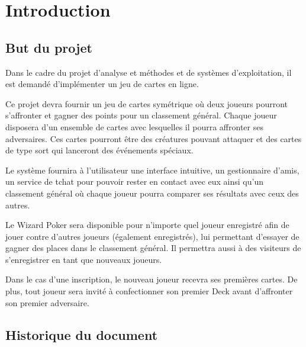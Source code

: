 \documentclass[11pt,a4paper]{article}
\begin{document}

\pagestyle{empty}
\tableofcontents
\newpage
\pagestyle{fancy}

\setcounter{page}{1}

\section{Introduction}
\label{sec:intro}

\subsection{But du projet}
\label{sec:but}

Dans le cadre du projet d'analyse et méthodes et de systèmes
d'exploitation, il est demandé d'implémenter un jeu de cartes en ligne.

\medbreak

Ce projet devra fournir un jeu de cartes symétrique où deux joueurs
pourront s'affronter et gagner des points pour un classement
général. Chaque joueur disposera d'un ensemble de cartes avec lesquelles
il pourra affronter ses adversaires. Ces cartes pourront être des
créatures pouvant attaquer et des cartes de type
sort qui lanceront des événements spéciaux.

\medbreak

Le système fournira à l'utilisateur une interface intuitive, un gestionnaire
d'amis, un service de tchat pour pouvoir rester en contact avec eux ainsi
qu'un classement général où chaque joueur pourra comparer ses résultats avec
ceux des autres.

\medbreak

Le Wizard Poker sera disponible pour n'importe quel joueur enregistré
afin de jouer contre d'autres joueurs (également enregistrés), lui
permettant d'essayer de gagner des places dans le classement
général. Il permettra aussi à des visiteurs de s'enregistrer en tant que nouveaux joueurs.


\medbreak

Dans le cas d'une inscription, le nouveau joueur recevra ses premières
cartes. De plus, tout joueur sera invité à confectionner son premier
Deck avant d'affronter son premier adversaire.

\subsection{Historique du document}
\label{sec:hist}
\end{document}
